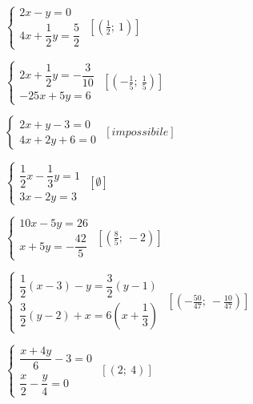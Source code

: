\begin{esercizio}[\Ast]
\begin{multicols}{2}
\begin{enumeratea}
{\item 
\(\left\{\begin{array}{l}
{2x-y=0}\\
{4x+\dfrac{1}{2}y=\dfrac{5}{2}}\end{array}\right.\)
 \hfill \(\left[\left(\frac{1}{2};~1\right)\right]\)
\item \(\left\{\begin{array}{l}
{2x+\dfrac{1}{2}y=-\dfrac{3}{10}}\\
{-25x+5y=6}\end{array}\right.\)
 \hfill \(\left[\left(-{\frac{1}{5}};~\frac{1}{5}\right)\right]\)
\item \(\left\{\begin{array}{l}
{2x+y-3=0}\\
{4x+2y+6=0}\end{array}\right.\)
 \hfill \(\left[impossibile\right]\)
\item \(\left\{\begin{array}{l}
{\dfrac{1}{2}x-\dfrac{1}{3}y=1}\\
{3x-2y=3}\end{array}\right.\)
 \hfill \(\left[\emptyset\right]\)
\item \(\left\{\begin{array}{l}
{10x-5y=26}\\
{x+5y=-\dfrac{42}{5}}\end{array}\right.\)
 \hfill \(\left[\left(\frac{8}{5};~-2\right)\right]\)
\item \(\left\{\begin{array}{l}
\dfrac{1}{2}(x-3)-y=\dfrac{3}{2}(y-1)\\
\dfrac{3}{2}(y-2)+x=6\left(x+\dfrac{1}{3}\right)\end{array}\right.\)
 \hfill \(\left[(-\frac{50}{47};~-\frac{10}{47})\right]\)
\item \(\left\{\begin{array}{l}
\dfrac{x+4y}{6}-3=0\\
\dfrac{x}{2}-\dfrac{y}{4}=0\end{array}\right.\)
 \hfill \(\left[(2;~4)\right]\)}
\end{enumeratea}
\end{multicols}
\end{esercizio}

